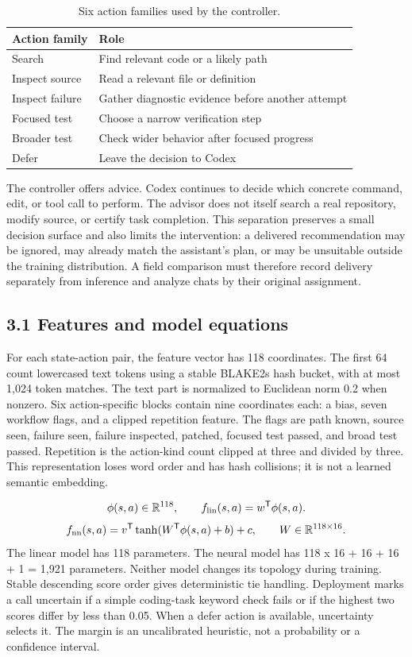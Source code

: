 \documentclass[11pt]{article}
\begin{document}
\begin{table}[htbp]
\centering
\small
\caption{Six action families used by the controller.}
\begin{tabularx}{\linewidth}{@{}XX@{}}
\toprule
Action family & Role\\
\midrule
Search & Find relevant code or a likely path\\
Inspect source & Read a relevant file or definition\\
Inspect failure & Gather diagnostic evidence before another attempt\\
Focused test & Choose a narrow verification step\\
Broader test & Check wider behavior after focused progress\\
Defer & Leave the decision to Codex\\
\bottomrule
\end{tabularx}
\end{table}
The controller offers advice. Codex continues to decide which concrete command, edit, or tool call to perform. The advisor does not itself search a real repository, modify source, or certify task completion. This separation preserves a small decision surface and also limits the intervention: a delivered recommendation may be ignored, may already match the assistant's plan, or may be unsuitable outside the training distribution. A field comparison must therefore record delivery separately from inference and analyze chats by their original assignment.

\subsection*{3.1 Features and model equations}
For each state-action pair, the feature vector has 118 coordinates. The first 64 count lowercased text tokens using a stable BLAKE2s hash bucket, with at most 1,024 token matches. The text part is normalized to Euclidean norm 0.2 when nonzero. Six action-specific blocks contain nine coordinates each: a bias, seven workflow flags, and a clipped repetition feature. The flags are path known, source seen, failure seen, failure inspected, patched, focused test passed, and broad test passed. Repetition is the action-kind count clipped at three and divided by three. This representation loses word order and has hash collisions; it is not a learned semantic embedding.

\[
\phi(s,a)\in\mathbb{R}^{118},\qquad f_{\rm lin}(s,a)=w^{\mathsf T}\phi(s,a).
\]
\[
f_{\rm nn}(s,a)=v^{\mathsf T}\tanh(W^{\mathsf T}\phi(s,a)+b)+c,\qquad W\in\mathbb{R}^{118\times16}.
\]
The linear model has 118 parameters. The neural model has 118 x 16 + 16 + 16 + 1 = 1,921 parameters. Neither model changes its topology during training. Stable descending score order gives deterministic tie handling. Deployment marks a call uncertain if a simple coding-task keyword check fails or if the highest two scores differ by less than 0.05. When a defer action is available, uncertainty selects it. The margin is an uncalibrated heuristic, not a probability or a confidence interval.
\end{document}
